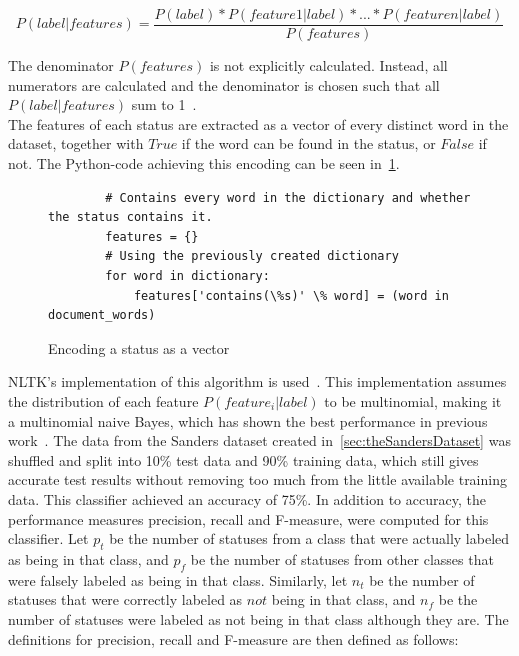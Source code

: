 \begin{equation}
    P(label|features) = \frac{P(label)*P(feature 1|label)*...*P(feature n|label)}{P(features)}
\end{equation}


The denominator $P(features)$ is not explicitly calculated.
Instead, all numerators are calculated and the denominator is chosen such that all $P(label|features)$ sum to 1~\cite{nltkDocs}.
\\
The features of each status are extracted as a vector of every distinct word in the dataset,
together with $True$ if the word can be found in the status, or $False$ if not.
The Python-code achieving this encoding can be seen in~\cref{code:extract_features}.

\begin{figure}
    \caption{Encoding a status as a vector}
    \label{code:extract_features}
    \begin{verbatim}
        # Contains every word in the dictionary and whether the status contains it.
        features = {}
        # Using the previously created dictionary
        for word in dictionary:
            features['contains(\%s)' \% word] = (word in document_words)
    \end{verbatim}
\end{figure}

NLTK's implementation of this algorithm is used~\cite{nltkDocs}.
This implementation assumes the distribution of each feature $P(feature_i|label)$ to be multinomial,
making it a multinomial naive Bayes, which has shown the best performance in previous work~\cite{Go2009}.
The data from the Sanders dataset created in~\cref{sec:theSandersDataset} was shuffled and split into 10\% test data and 90\% training data,
which still gives accurate test results without removing too much from the little available training data.
This classifier achieved an accuracy of 75\%.
In addition to accuracy, the performance measures precision, recall and F-measure, were computed for this classifier.
Let $p_t$ be the number of statuses from a class that were actually labeled as being in that class,
and $p_f$ be the number of statuses from other classes that were falsely labeled as being in that class.
Similarly, let $n_t$ be the number of statuses that were correctly labeled as $not$ being in that class,
and $n_f$ be the number of statuses were labeled as not being in that class although they are.
The definitions for precision, recall and F-measure are then defined as follows:

